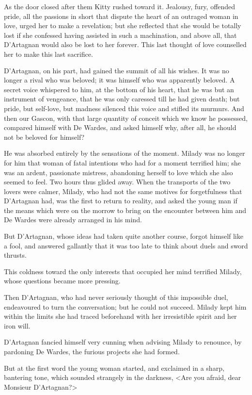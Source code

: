 As the door closed after them Kitty rushed toward it. Jealousy, fury, offended pride, all the passions in short that dispute the heart of an outraged woman in love, urged her to make a revelation; but she reflected that she would be totally lost if she confessed having assisted in such a machination, and above all, that D'Artagnan would also be lost to her forever. This last thought of love counselled her to make this last sacrifice. 

D'Artagnan, on his part, had gained the summit of all his wishes. It was no longer a rival who was beloved; it was himself who was apparently beloved. A secret voice whispered to him, at the bottom of his heart, that he was but an instrument of vengeance, that he was only caressed till he had given death; but pride, but self-love, but madness silenced this voice and stifled its murmurs. And then our Gascon, with that large quantity of conceit which we know he possessed, compared himself with De Wardes, and asked himself why, after all, he should not be beloved for himself? 

He was absorbed entirely by the sensations of the moment. Milady was no longer for him that woman of fatal intentions who had for a moment terrified him; she was an ardent, passionate mistress, abandoning herself to love which she also seemed to feel. Two hours thus glided away. When the transports of the two lovers were calmer, Milady, who had not the same motives for forgetfulness that D'Artagnan had, was the first to return to reality, and asked the young man if the means which were on the morrow to bring on the encounter between him and De Wardes were already arranged in his mind. 

But D'Artagnan, whose ideas had taken quite another course, forgot himself like a fool, and answered gallantly that it was too late to think about duels and sword thrusts. 

This coldness toward the only interests that occupied her mind terrified Milady, whose questions became more pressing. 

Then D'Artagnan, who had never seriously thought of this impossible duel, endeavoured to turn the conversation; but he could not succeed. Milady kept him within the limits she had traced beforehand with her irresistible spirit and her iron will. 

D'Artagnan fancied himself very cunning when advising Milady to renounce, by pardoning De Wardes, the furious projects she had formed. 

But at the first word the young woman started, and exclaimed in a sharp, bantering tone, which sounded strangely in the darkness, <Are you afraid, dear Monsieur D'Artagnan?> 

